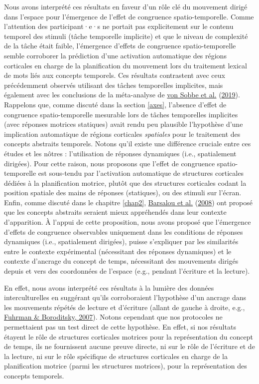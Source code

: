 \documentclass[
  a4paper,12pt,twoside,onecolumn,openright,final,oldfontcommands]{memoir}
\begin{document}
Nous avons interprété ces résultats en faveur d'un rôle clé du mouvement dirigé dans l'espace pour l'émergence de l'effet de congruence spatio-temporelle. Comme l'attention des participant·e·s ne portait pas explicitement sur le contenu temporel des stimuli (tâche temporelle implicite) et que le niveau de complexité de la tâche était faible, l'émergence d'effets de congruence spatio-temporelle semble corroborer la prédiction d'une activation automatique des régions corticales en charge de la planification du mouvement lors du traitement lexical de mots liés aux concepts temporels. Ces résultats contrastent avec ceux précédemment observés utilisant des tâches temporelles implicites, mais également avec les conclusions de la méta-analyse de \protect\hyperlink{ref-von_sobbe_space-time_2019}{von Sobbe et al.} (\protect\hyperlink{ref-von_sobbe_space-time_2019}{2019}). Rappelons que, comme discuté dans la section \ref{axes}, l'absence d'effet de congruence spatio-temporelle mesurable lors de tâches temporelles implicites (avec réponses motrices statiques) avait rendu peu plausible l'hypothèse d'une implication automatique de régions corticales \emph{spatiales} pour le traitement des concepts abstraits temporels. Notons qu'il existe une différence cruciale entre ces études et les nôtres : l'utilisation de réponses dynamiques (i.e., spatialement dirigées). Pour cette raison, nous proposons que l'effet de congruence spatio-temporelle est sous-tendu par l'activation automatique de structures corticales dédiées à la planification motrice, plutôt que des structures corticales codant la position spatiale des mains de réponses (statiques), ou des stimuli sur l'écran. Enfin, comme discuté dans le chapitre \ref{chap2}, \protect\hyperlink{ref-barsalou_language_2008}{Barsalou et al.} (\protect\hyperlink{ref-barsalou_language_2008}{2008}) ont proposé que les concepts abstraits seraient mieux appréhendés dans leur contexte d'apparition. À l'appui de cette proposition, nous avons proposé que l'émergence d'effets de congruence observables uniquement dans les conditions de réponses dynamiques (i.e., spatialement dirigées), puisse s'expliquer par les similarités entre le contexte expérimental (nécessitant des réponses dynamiques) et le contexte d'ancrage du concept de temps, nécessitant des mouvements dirigés depuis et vers des coordonnées de l'espace (e.g., pendant l'écriture et la lecture).

En effet, nous avons interprété ces résultats à la lumière des données interculturelles en suggérant qu'ils corroboraient l'hypothèse d'un ancrage dans les mouvements répétés de lecture et d'écriture (allant de gauche à droite, e.g., \protect\hyperlink{ref-fuhrman_mental_2007}{Fuhrman \& Boroditsky, 2007}). Notons cependant que nos protocoles ne permettaient pas un test direct de cette hypothèse. En effet, si nos résultats étayent le rôle de structures corticales motrices pour la représentation du concept de temps, ils ne fournissent aucune preuve directe, ni sur le rôle de l'écriture et de la lecture, ni sur le rôle spécifique de structures corticales en charge de la planification motrice (parmi les structures motrices), pour la représentation des concepts temporels.
\end{document}
